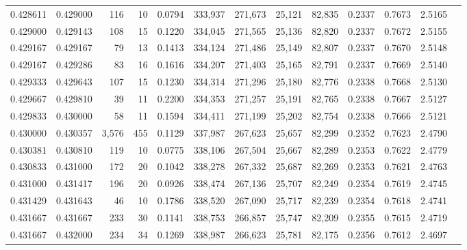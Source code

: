 \begin{tabular}{rrrrrrrrrrrrr}
0.428611 & 0.429000 &   116 &  10 &                                     0.0794 & 333,937 & 271,673 &  25,121 &  82,835 & 0.2337 & 0.7673 & 2.5165 \\
0.429000 & 0.429143 &   108 &  15 &                                     0.1220 & 334,045 & 271,565 &  25,136 &  82,820 & 0.2337 & 0.7672 & 2.5155 \\
0.429167 & 0.429167 &    79 &  13 &                                     0.1413 & 334,124 & 271,486 &  25,149 &  82,807 & 0.2337 & 0.7670 & 2.5148 \\
0.429167 & 0.429286 &    83 &  16 &                                     0.1616 & 334,207 & 271,403 &  25,165 &  82,791 & 0.2337 & 0.7669 & 2.5140 \\
0.429333 & 0.429643 &   107 &  15 &                                     0.1230 & 334,314 & 271,296 &  25,180 &  82,776 & 0.2338 & 0.7668 & 2.5130 \\
0.429667 & 0.429810 &    39 &  11 &                                     0.2200 & 334,353 & 271,257 &  25,191 &  82,765 & 0.2338 & 0.7667 & 2.5127 \\
0.429833 & 0.430000 &    58 &  11 &                                     0.1594 & 334,411 & 271,199 &  25,202 &  82,754 & 0.2338 & 0.7666 & 2.5121 \\
0.430000 & 0.430357 & 3,576 & 455 &                                     0.1129 & 337,987 & 267,623 &  25,657 &  82,299 & 0.2352 & 0.7623 & 2.4790 \\
0.430381 & 0.430810 &   119 &  10 &                                     0.0775 & 338,106 & 267,504 &  25,667 &  82,289 & 0.2353 & 0.7622 & 2.4779 \\
0.430833 & 0.431000 &   172 &  20 &                                     0.1042 & 338,278 & 267,332 &  25,687 &  82,269 & 0.2353 & 0.7621 & 2.4763 \\
0.431000 & 0.431417 &   196 &  20 &                                     0.0926 & 338,474 & 267,136 &  25,707 &  82,249 & 0.2354 & 0.7619 & 2.4745 \\
0.431429 & 0.431643 &    46 &  10 &                                     0.1786 & 338,520 & 267,090 &  25,717 &  82,239 & 0.2354 & 0.7618 & 2.4741 \\
0.431667 & 0.431667 &   233 &  30 &                                     0.1141 & 338,753 & 266,857 &  25,747 &  82,209 & 0.2355 & 0.7615 & 2.4719 \\
0.431667 & 0.432000 &   234 &  34 &                                     0.1269 & 338,987 & 266,623 &  25,781 &  82,175 & 0.2356 & 0.7612 & 2.4697 \\

\end{tabular}
